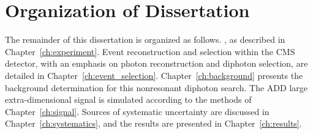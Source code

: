 \section{Organization of Dissertation}

The remainder of this dissertation is organized as follows. , as described in Chapter~\ref{ch:experiment}. Event reconstruction and selection within the CMS detector, with an emphasis on photon reconstruction and diphoton selection, are detailed in Chapter~\ref{ch:event_selection}. Chapter~\ref{ch:background} presents the background determination for this nonresonant diphoton search. The ADD large extra-dimensional signal is simulated according to the methods of Chapter~\ref{ch:signal}. Sources of systematic uncertainty are discussed in Chapter~\ref{ch:systematics}, and the results are presented in Chapter~\ref{ch:results}.



